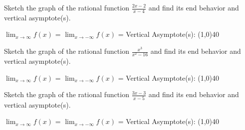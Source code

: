 \documentclass[addpoints]{exam}
\begin{document}
\begin{questions}
    \question[1] Sketch the graph of the rational function $\frac{2x - 2}{x - 4}$ and find its end behavior and vertical asymptote(s).
    
        \begin{left} 
        \end{left}
    
    $\lim_{x\to\infty} f(x)$ =
    \newline
    $\lim_{x\to-\infty} f(x)$ =
    \newline
    Vertical Asymptote(s): \line(1,0){40} \\
    
    \question[1] Sketch the graph of the rational function $\frac{x^3}{x^2 - 16}$ and find its end behavior and vertical asymptote(s).
    
        \begin{left} 
        \end{left}
        
    $\lim_{x\to\infty} f(x)$ =
    \newline
    $\lim_{x\to-\infty} f(x)$ =
    \newline
    Vertical Asymptote(s): \line(1,0){40} \\
   
    \question[1] Sketch the graph of the rational function $\frac{3x - 3}{x - 5}$ and find its end behavior and vertical asymptote(s).
    
        \begin{left} 
        \end{left}
        
    $\lim_{x\to\infty} f(x)$ =
    \newline
    $\lim_{x\to-\infty} f(x)$ =
    \newline
    Vertical Asymptote(s): \line(1,0){40} \\
    

\end{questions}
\end{document}
